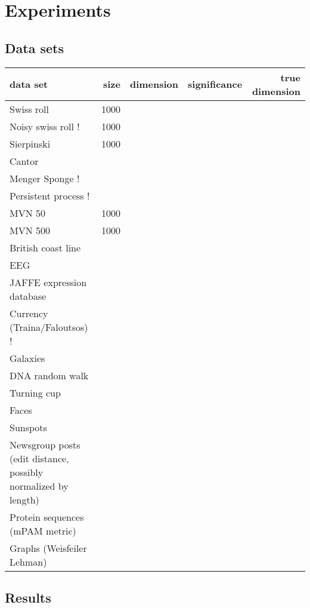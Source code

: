 \documentclass[11pt]{article}
\begin{document}
\section{Experiments}
\subsection{Data sets}

\pagebreak
\begin{landscape}

\begin{tabular}{l | r r r r}
\hline
data set & size & dimension & significance & true dimension \\
\hline
Swiss roll & 1000 & & & \\
Noisy swiss roll ! & 1000 & & & \\ 
Sierpinski & 1000 & & & \\
Cantor & & & & \\
Menger Sponge ! & & & & \\
Persistent process ! & & & & \\
  
MVN 50 & 1000 & & & \\ 
MVN 500 & 1000 & & & \\
 
British coast line & & & & \\
   
EEG & & & & \\
JAFFE expression database & & & & \\
Currency (Traina/Faloutsos) ! & & & & \\
Galaxies & & & & \\
DNA random walk & & & & \\
Turning cup & & & & \\ 
Faces & & & & \\ 
Sunspots & & & & \\

Newsgroup posts (edit distance, possibly normalized by length) & & & & \\
Protein sequences (mPAM metric) & & & & \\
Graphs (Weisfeiler Lehman) & & & & \\
\hline
\end{tabular}

\end{landscape}
\pagebreak

\subsection{Results}
\end{document}
